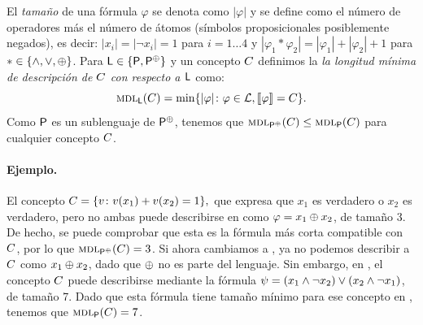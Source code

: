 El {\em tamaño} de una fórmula $\varphi$ se denota como $|\varphi|$ y se define como el número de operadores más el número de átomos (símbolos proposicionales posiblemente negados), es decir: $|x_i|=|\lnot x_i|=1$ para $i=1\dots 4$ y $|\varphi_1*\varphi_2|=|\varphi_1|+|\varphi_2|+1$ para $*\in\{\wedge,\vee,\oplus\}$. Para ${\sf L} \in\{{\sf P},{\sf P}^\oplus\}$ y un concepto $C$ definimos la {\em la longitud mínima de descripción de $C$ con respecto a $\mathcal {\sf L}$} como:
$$
\textsc{mdl}_{\sf L}(C)=\min\{|\varphi|\colon \varphi\in\mathcal L, \llbracket \varphi\rrbracket=C\}.
$$
Como ${\sf P}$ es un sublenguaje de ${\sf P}^\oplus$, tenemos que $\textsc{mdl}_{{\sf P}^\oplus}(C)\leq\textsc{mdl}_{{\sf P}}(C)$ para cualquier concepto $C$.
   
\paragraph*{Ejemplo.}El concepto $
C=\{v\colon v(x_1)+v(x_2)=1\},
$
que expresa que $x_1$ es verdadero o $x_2$ es verdadero, pero no ambas puede describirse en \gramboolxor como $\varphi=x_{1} \oplus x_{2}$, de tamaño 3. De hecho, se puede comprobar que esta es la fórmula más corta compatible con $C$, por lo que $\textsc{mdl}_{{\sf P}^\oplus}(C)=3$. Si ahora cambiamos a \grambool, ya no podemos describir a $C$ como $x_{1} \oplus x_{2}$, dado que $\oplus$ no es parte del lenguaje. Sin embargo, en \grambool, el concepto $C$ puede describirse mediante la fórmula $\psi=(x_{1} \wedge \neg x_{2}) \vee (x_{2} \wedge \neg x_{1})$, de tamaño 7. Dado que esta fórmula tiene tamaño mínimo para ese concepto en \grambool, tenemos que $\textsc{mdl}_{{\sf P}}(C)=7$.

